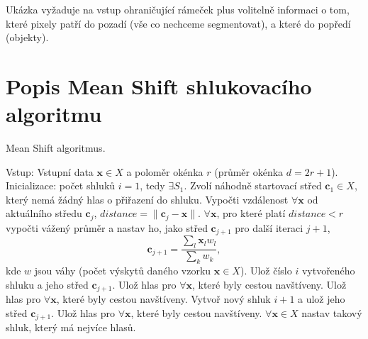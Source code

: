 \documentclass[12pt, a4paper]{article}
\begin{document}
\par{Ukázka vyžaduje na vstup ohraničující rámeček plus volitelně informaci o tom, které pixely patří do pozadí (vše co nechceme segmentovat), a které do popředí (objekty).}

\newpage











\section{Popis Mean Shift shlukovacího algoritmu}
\begin{algorithm}[!ht]
	\caption{Mean Shift algoritmus.}
	\label{alg:MeanShift2D}
	\begin{algorithmic}[1]
		\State Vstup: Vstupní data $\bm{x} \in X$ a poloměr okénka $r$ (průměr okénka $d = 2r + 1$).
		\State Inicializace: počet shluků $i = 1$, tedy $\exists S_1$.
			\State Zvolí náhodně startovací střed $\bm{c}_1 \in X$, který nemá žádný hlas o přiřazení do shluku.
				\State Vypočti vzdálenost $\forall \bm{x}$ od aktuálního středu $\bm{c}_j$, $distance = \| \bm{c}_j - \bm{x} \|$.
				\State $\forall \bm{x}$, pro které platí $distance < r$ vypočti vážený průměr a nastav ho, jako střed $\bm{c}_{j+1}$ pro další iteraci $j+1$,
					\begin{equation}
						\bm{c}_{j+1}	= \frac{\sum_{l} \bm{x}_l w_l }{\sum_{k} w_k},
					\end{equation}
					kde $w$ jsou váhy (počet výskytů daného vzorku $\bm{x} \in X$). 
						\State Ulož číslo $i$ vytvořeného shluku a jeho střed $\bm{c}_{j+1}$.
						\State Ulož hlas pro $\forall \bm{x}$, které byly cestou navštíveny.
					\Else
							\State Ulož hlas pro $\forall \bm{x}$, které byly cestou navštíveny. 
						\Else
							\State Vytvoř nový shluk $i + 1$ a ulož jeho střed $\bm{c}_{j+1}$. 							\State Ulož hlas pro $\forall \bm{x}$, které byly cestou navštíveny. 
						\EndIf
					\EndIf
				\EndIf
			\EndWhile			
		\EndWhile
		\State $\forall \bm{x} \in X$ nastav takový shluk, který má nejvíce hlasů.
	\end{algorithmic}
\end{algorithm}
\end{document}
